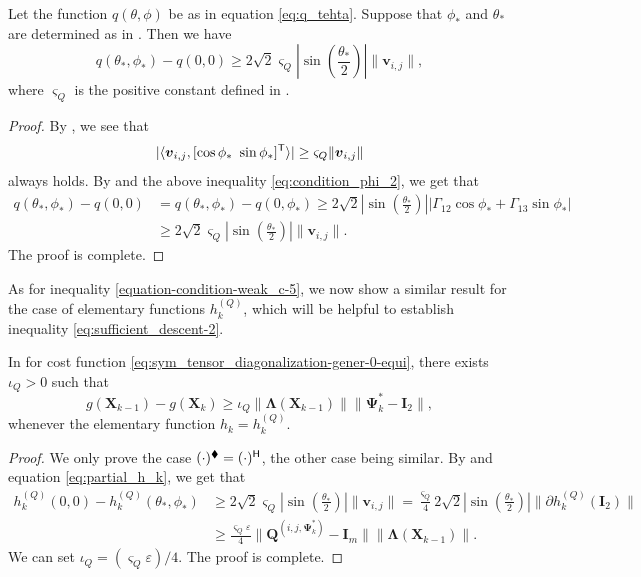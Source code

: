\documentclass[final,onefignum,onetabnum]{siamart190516}
\newcommand{\matr}[1]{\boldsymbol{#1}}
\newcommand{\vect}[1]{\boldsymbol{#1}}
\newcommand{\T}{{\sf T}} %
\renewcommand{\H}{{\sf H}} %
\newcommand{\Gmat}[3]{\matr{Q}^{(#1,#2,#3)}}
\newcommand{\Utwo}{\Psi}
\renewcommand{\H}{{\sf H}}      %
\renewcommand{\TH}{{\blacklozenge}}
\begin{document}
\begin{lemma}\label{lem:p_theta_phi}
Let the function $q(\theta,\phi)$ be as in equation \cref{eq:q_tehta}.
Suppose that $\phi_*$ and $\theta_*$ are determined as in . 
Then we have
\begin{equation*}
q(\theta_*,\phi_*)-q(0,0)\geq 2\sqrt{2}\varsigma_{Q} \left|\sin(\frac{\theta_{*}}{2})\right|\|\vect{v}_{i,j}\|, 
\end{equation*}
where $\varsigma_{Q}$ is the positive constant defined in . 
\end{lemma}
\begin{proof}
By , we see that 
\begin{equation}\label{eq:condition_phi_2}
|\langle\vect{v}_{i,j},[\cos\phi_*\ \sin\phi_*]^\T\rangle|
\geq\varsigma_{Q}\|\vect{v}_{i,j}\|
\end{equation}
always holds. 
By  and the above inequality \cref{eq:condition_phi_2}, we get that 
\begin{align*}
q(\theta_{*},\phi_{*})-q(0,0)&=q(\theta_{*},\phi_{*})-q(0,\phi_{*})\geq 2\sqrt{2}\left|\sin(\frac{\theta_*}{2})\right||\Gamma_{12}\cos\phi_*+\Gamma_{13}\sin\phi_*|\\
&\geq 2\sqrt{2}
\varsigma_{Q}\left|\sin(\frac{\theta_*}{2})\right|\|\vect{v}_{i,j}\|.
\end{align*}
The proof is complete.	
\end{proof}

As for inequality \cref{equation-condition-weak_c-5}, we now show a similar result for the case of elementary functions $h^{(Q)}_{k}$, which will be helpful to establish inequality \cref{eq:sufficient_descent-2}. 

\begin{lemma}\label{lemma:h_k_condition_SU-0}
In  for cost function \cref{eq:sym_tensor_diagonalization-gener-0-equi},
there exists $\iota_{Q}>0$ such that \begin{equation}\label{equation-condition-weak_c-5-1}
g(\matr{X}_{k-1})-g(\matr{X}_{k})\geq\iota_{Q}\|\matr{\Lambda}(\matr{X}_{k-1})\|\|\matr{\Utwo}^{*}_{k}-\matr{I}_{2}\|,
\end{equation}
whenever the elementary function $h_k=h^{(Q)}_{k}$. 
\end{lemma}
\begin{proof}
We only prove the case $(\cdot)^{\TH}=(\cdot)^{\H}$, the other case being similar.  
By  and equation \cref{eq:partial_h_k}, we get that
\begin{align*}
h^{(Q)}_k(0,0)-h^{(Q)}_k(\theta_*,\phi_*) &\geq 2\sqrt{2}\varsigma_{Q} \left|\sin(\frac{\theta_{*}}{2})\right|\|\vect{v}_{i,j}\|
= \frac{\varsigma_{Q}}{4} 2\sqrt{2}\left|\sin(\frac{\theta_{*}}{2})\right|\|\partial h^{(Q)}_k(\matr{I}_2)\|\\
&\geq \frac{\varsigma_{Q}\varepsilon}{4}  \|\Gmat{i}{j}{\matr{\Utwo}_{k}^{*}}-\matr{I}_m\|\|\matr{\Lambda}(\matr{X}_{k-1})\|.
\end{align*}
We can set $\iota_{Q}=(\varsigma_{Q}\varepsilon)/{4}$. The proof is complete. 
\end{proof}
\end{document}
